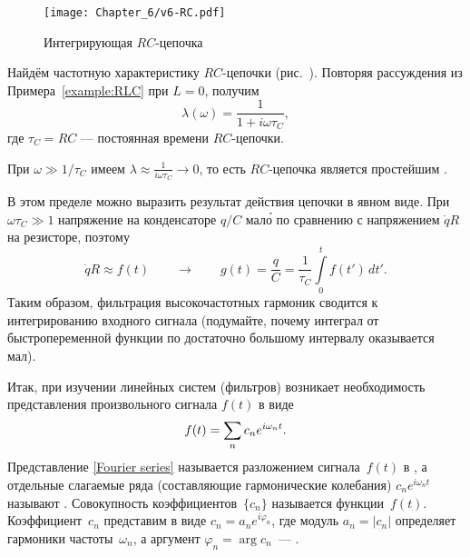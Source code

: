 \begin{wrapfigure}[14]{o}{0.25\textwidth}
\centering\texttt{[image: Chapter\_6/v6-RC.pdf]}
\caption{\footnotesize Интегрирующая $RC$-цепочка}
\end{wrapfigure}

\begin{lab:example}\label{example:RC}
Найдём частотную характеристику $RC$-цепочки (рис.~).
Повторяя рассуждения из Примера~\ref{example:RLC} при $L=0$, получим
\begin{equation*}
\lambda(\omega) = \frac{1}{1+i\omega \tau_C},
\end{equation*}
где $\tau_C=RC$ --- постоянная времени $RC$-цепочки.

При $\omega \gg 1/\tau_C$ имеем $\lambda \approx \frac{1}{i\omega\tau_C} \to 0$,
то есть $RC$-цепочка является простейшим .

В этом пределе можно выразить результат действия цепочки в явном виде.
При $\omega\tau_C\gg1$ напряжение на конденсаторе $q/C$ мал\'{о} по сравнению
с напряжением $\dot{q}R$ на резисторе, поэтому
\begin{equation*}
\dot{q} R \approx f(t) \qquad \to \qquad g(t) = \frac{q}{C} = \frac{1}{\tau_C}\int\limits_0^t f(t')\,dt'.
\end{equation*}
Таким образом, фильтрация высокочастотных гармоник сводится к интегрированию
входного сигнала (подумайте, почему интеграл от быстропеременной функции
по достаточно большому интервалу оказывается мал).
\end{lab:example}


Итак, при изучении линейных систем (фильтров) возникает необходимость
представления произвольного сигнала $f(t)$ в виде
\begin{equation}
    \eqmark{Fourier series}
    f(t)=\sum\limits_n c_n e^{i\omega_n t}.
\end{equation}
Представление \eqref{Fourier series} называется разложением сигнала~$f(t)$ в
, а отдельные слагаемые ряда (составляющие
гармонические колебания) $c_n e^{i\omega_n t}$ называют .
Совокупность коэффициентов~$\{c_n\}$ называется  функции~$f(t)$.
Коэффициент~$c_n$ представим в виде $c_n=a_ne^{i\varphi_n}$, где
модуль $a_n=|c_n|$ определяет  гармоники частоты~$\omega_n$,
а аргумент $\varphi_n=\arg c_n$~--- .

